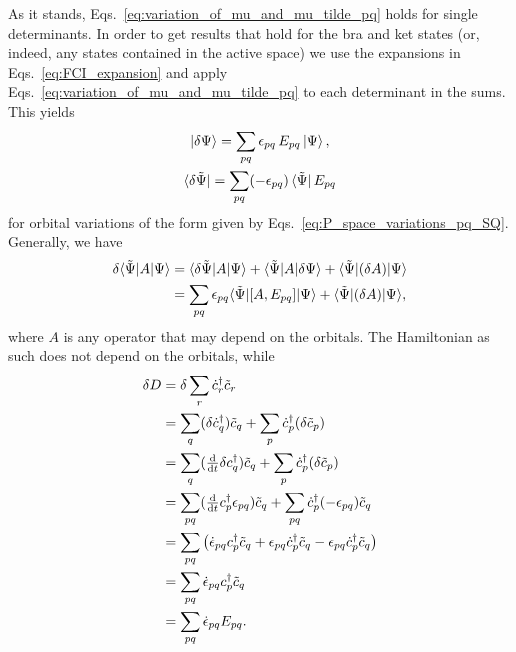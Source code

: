 \documentclass[aip,jcp,preprint,superscriptaddress,nofootinbib]{revtex4-1}
\begin{document}
As it stands, Eqs.~\eqref{eq:variation_of_mu_and_mu_tilde_pq} holds for single determinants. In order to get results that hold for the bra and ket states
(or, indeed, any states contained in the active space) we use the expansions in
Eqs.~\eqref{eq:FCI_expansion} and apply Eqs.~\eqref{eq:variation_of_mu_and_mu_tilde_pq} to each determinant in the sums.
This yields
\begin{subequations} \label{eq:variation_of_Psi_and_Psi_tilde_pq}
    \begin{gather}
        \ket{\delta \Psi}         = \sum_{pq} \epsilon_{pq} \,  E_{{p} {q}} \ket{\Psi}  , \\
        \bra{\delta \tilde{\Psi}} = \sum_{pq} (-\epsilon_{pq}) \bra{\tilde{\Psi}} E_{{p} {q}}
    \end{gather}
\end{subequations}
for orbital variations of the form given by Eqs.~\eqref{eq:P_space_variations_pq_SQ}.
Generally, we have
\begin{align}
    \delta \langle \tilde{\Psi} \vert A \vert \Psi \rangle
    &= \langle \delta \tilde{\Psi} \vert A \vert \Psi \rangle + \langle \tilde{\Psi} \vert A \vert \delta \Psi \rangle + \langle \tilde{\Psi} \vert (\delta A) \vert \Psi \rangle \nonumber\\
    &= \sum_{pq} \epsilon_{pq} \langle \tilde{\Psi} \vert [A, E_{{p} {q}}]  \vert \Psi \rangle + \langle \tilde{\Psi} \vert (\delta A) \vert \Psi \rangle,
\end{align}
where $A$ is any operator that may depend on the orbitals. The Hamiltonian as such does not depend on
the orbitals, while
\begin{align}
    \delta D 
    &= \delta \sum_{r} \dot{c}^{\dagger}_{r} \tilde{c}_{r} \nonumber\\
    &= \sum_{q} (\delta \dot{c}^{\dagger}_{q}) \tilde{c}_{q} + \sum_{p} \dot{c}^{\dagger}_{p} (\delta\tilde{c}_{p}) \nonumber\\
    &= \sum_{q} (\tfrac{\mathrm{d}}{\mathrm{d} t} \delta c^{\dagger}_{q}) \tilde{c}_{q} + \sum_{p} \dot{c}^{\dagger}_{p} (\delta\tilde{c}_{p}) \nonumber\\
    &= \sum_{pq} (\tfrac{\mathrm{d}}{\mathrm{d} t} c^{\dagger}_{p} \epsilon_{pq}) \tilde{c}_{q} + \sum_{pq} \dot{c}^{\dagger}_{p} (-\epsilon_{pq}) \tilde{c}_{q} \nonumber\\
    &= \sum_{pq} \left( \dot{\epsilon}_{pq} c^{\dagger}_{p} \tilde{c}_{q} + \epsilon_{pq} \dot{c}^{\dagger}_{p} \tilde{c}_{q} - \epsilon_{pq} \dot{c}^{\dagger}_{p} \tilde{c}_{q}  \right) \nonumber\\
    &= \sum_{pq} \dot{\epsilon}_{pq} c^{\dagger}_{p} \tilde{c}_{q} \nonumber\\
    &= \sum_{pq} \dot{\epsilon}_{pq} E_{{p} {q}}.
\end{align}
\end{document}
